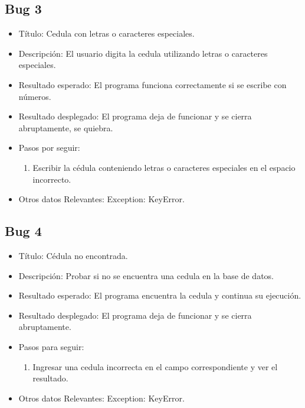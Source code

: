 \documentclass[conference]{IEEEtran}
\begin{document}
\subsection*{Bug 3}
\begin{itemize}
\item Título: Cedula con letras o caracteres especiales.

\item Descripción: El usuario digita la cedula utilizando letras o caracteres especiales.

\item Resultado esperado: El programa funciona correctamente si se escribe con números.

\item Resultado desplegado: El programa deja de funcionar y se cierra abruptamente, se quiebra. 

\item Pasos por seguir: 
\begin{enumerate}
\item Escribir la cédula conteniendo letras o caracteres especiales en el espacio incorrecto.
\end{enumerate}

\item Otros datos Relevantes: Exception: KeyError.
\end{itemize}
\subsection*{Bug 4}
\begin{itemize}
\item Título: Cédula no encontrada.

\item Descripción: Probar si no se encuentra una cedula en la base de datos.

\item Resultado esperado: El programa encuentra la cedula y continua su ejecución.

\item Resultado desplegado: El programa deja de funcionar y se cierra abruptamente.
 
\item Pasos para seguir: 
\begin{enumerate}
\item Ingresar una cedula incorrecta en el campo correspondiente y ver el resultado.
\end{enumerate}
\item Otros datos Relevantes: Exception: KeyError.

\end{itemize}
\end{document}
